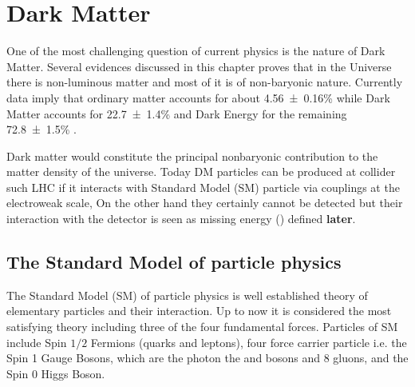 \chapter{Dark Matter}
One of the most challenging question of current physics is the nature of Dark Matter. Several evidences discussed in this chapter proves that in the Universe there is non-luminous matter and most of it is of non-baryonic nature. Currently data imply that ordinary matter accounts for about \num{4.56\pm0.16}\% while Dark Matter accounts for \num{22.7\pm1.4}\% and Dark Energy for the remaining \num{72.8\pm1.5}\% \cite{komatsu:abundance}.

Dark matter would constitute the principal nonbaryonic contribution to the matter density of the universe. Today DM particles can be produced at collider such LHC if it interacts with Standard Model (SM) particle via couplings at the electroweak scale, On the other hand they certainly cannot be detected but their interaction with the detector is seen as missing energy (\met) defined \textbf{later}. 

\section{The Standard Model of particle physics}
The Standard Model (SM) of particle physics is well established theory of elementary particles and their interaction. Up to now it is considered the most satisfying theory including three of the four fundamental forces.
Particles of SM include Spin $1/2$ Fermions (quarks and leptons), four force carrier particle i.e. the Spin 1 Gauge Bosons, which are the photon the \Zboson and \Wboson bosons and 8 gluons, and the Spin 0 Higgs Boson.
\\
 

\lipsum